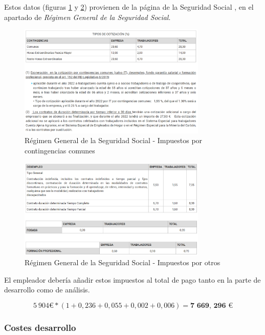 Estos datos (figuras \ref{fig:segsocial_contin} y \ref{fig:segsocial_otros}) provienen de la página de la Seguridad Social \cite{seguridad:social}, en el apartado de \textit{Régimen General de la Seguridad Social}.

\begin{figure}[h!] 
\centering
    \includegraphics[width=0.8\textwidth]{img/seguridadsocial_1.PNG}
\caption{Régimen General de la Seguridad Social - Impuestos por contingencias comunes}
\label{fig:segsocial_contin}
\end{figure}

\begin{figure}[h!] 
\centering
    \includegraphics[width=0.8\textwidth]{img/seguridadsocial_2.PNG}
\caption{Régimen General de la Seguridad Social - Impuestos por otros}
\label{fig:segsocial_otros}
\end{figure}

El empleador debería añadir estos impuestos al total de pago tanto en la parte de desarrollo como de análisis.

$$ 5\:904 \textbf{€} * (1 + 0,236 + 0,055 + 0,002 + 0,006) = \textbf{7 669, 296 €} $$


\subsubsection{Costes desarrollo}

